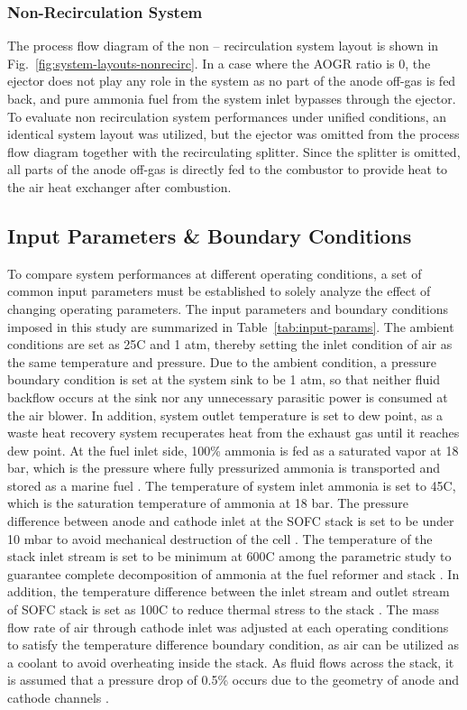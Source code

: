 \documentclass[a4paper,10pt]{cas-dc} %
\begin{document}
\subsubsection{Non-Recirculation System}

The process flow diagram of the non -- recirculation system layout is shown in Fig.~\ref{fig:system-layouts-nonrecirc}.
In a case where the AOGR ratio is 0, the ejector does not play any role in the system as no part of the anode off-gas is fed back, and pure ammonia fuel from the system inlet bypasses through the ejector.
To evaluate non recirculation system performances under unified conditions, an identical system layout was utilized, but the ejector was omitted from the process flow diagram together with the recirculating splitter.
Since the splitter is omitted, all parts of the anode off-gas is directly fed to the combustor to provide heat to the air heat exchanger after combustion.

\subsection{Input Parameters \& Boundary Conditions}

To compare system performances at different operating conditions, a set of common input parameters must be established to solely analyze the effect of changing operating parameters.
The input parameters and boundary conditions imposed in this study are summarized in Table~\ref{tab:input-params}.
The ambient conditions are set as 25\textdegree C and 1 atm, thereby setting the inlet condition of air as the same temperature and pressure.
Due to the ambient condition, a pressure boundary condition is set at the system sink to be 1 atm, so that neither fluid backflow occurs at the sink nor any unnecessary parasitic power is consumed at the air blower.
In addition, system outlet temperature is set to dew point, as a waste heat recovery system recuperates heat from the exhaust gas until it reaches dew point.
At the fuel inlet side, 100\% ammonia is fed as a saturated vapor at 18 bar, which is the pressure where fully pressurized ammonia is transported and stored as a marine fuel \cite{DNV2023AmmoniaMarineFuelHandbook}.
The temperature of system inlet ammonia is set to 45\textdegree C, which is the saturation temperature of ammonia at 18 bar.
The pressure difference between anode and cathode inlet at the SOFC stack is set to be under 10 mbar to avoid mechanical destruction of the cell \cite{SEIDLER20117195}.
The temperature of the stack inlet stream is set to be minimum at 600\textdegree C among the parametric study to guarantee complete decomposition of ammonia at the fuel reformer and stack \cite{LUCENTINI201912693}.
In addition, the temperature difference between the inlet stream and outlet stream of SOFC stack is set as 100\textdegree C to reduce thermal stress to the stack \cite{CINTI202315269}.
The mass flow rate of air through cathode inlet was adjusted at each operating conditions to satisfy the temperature difference boundary condition, as air can be utilized as a coolant to avoid overheating inside the stack.
As fluid flows across the stack, it is assumed that a pressure drop of 0.5\% occurs due to the geometry of anode and cathode channels \cite{LEE2025238271}.
\end{document}

